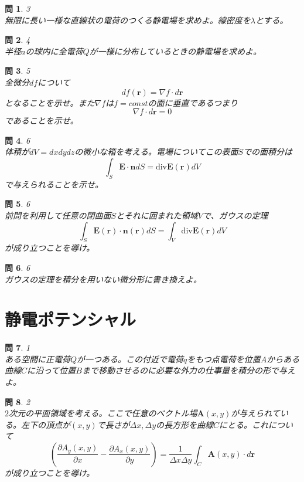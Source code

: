 \documentclass{jsarticle}
\newtheorem{pro}{問}[section]
\begin{document}
\begin{pro}3\\
無限に長い一様な直線状の電荷のつくる静電場を求めよ。線密度を\(\lambda\)とする。
\end{pro}

\begin{pro}4\\
半径\(a\)の球内に全電荷\(Q\)が一様に分布しているときの静電場を求めよ。
\end{pro}

\begin{pro}5\\
全微分\(df\)について
\[df(\bm{r})=\nabla f\cdot d\bm{r}\]
となることを示せ。また\(\nabla f\)は\(f=const\)の面に垂直であるつまり
\[\nabla f\cdot d\bm{r}=0\]
であることを示せ。
\end{pro}

\begin{pro}6\\
体積が\(dV=dxdydz\)の微小な箱を考える。電場についてこの表面\(S\)での面積分は
\[\int_{S}\bm{E}\cdot\bm{n}dS=\mathrm{div}\bm{E}(\bm{r})dV\]
で与えられることを示せ。
\end{pro}

\begin{pro}6\\
前問を利用して任意の閉曲面\(S\)とそれに囲まれた領域\(V\)で、ガウスの定理
\[\int_{S}\bm{E}(\bm{r})\cdot\bm{n}(\bm{r})dS=\int_{V}\mathrm{div}\bm{E}(\bm{r})dV\]
が成り立つことを導け。
\end{pro}

\begin{pro}6\\
ガウスの定理を積分を用いない微分形に書き換えよ。
\end{pro}





\section{静電ポテンシャル}
\noindent
\begin{pro}1\\
ある空間に正電荷\(Q\)が一つある。この付近で電荷\(q\)をもつ点電荷を位置\(A\)からある曲線\(C\)に沿って位置\(B\)まで移動させるのに必要な外力の仕事量を積分の形で与えよ。
\end{pro}

\begin{pro}2\\
\(2\)次元の平面領域を考える。ここで任意のベクトル場\(\bm{A}(x,y)\)が与えられている。左下の頂点が\((x,y)\)で長さが\(\Delta x,\Delta y\)の長方形を曲線\(C\)にとる。これについて
\[\left(\frac{\partial A_{y}(x,y)}{\partial x}-\frac{\partial A_{x}(x,y)}{\partial y}\right)=\frac{1}{\Delta x\Delta y}\int_{C}\bm{A}(x,y)\cdot d\bm{r}\]
が成り立つことを導け。
\end{pro}
\end{document}

